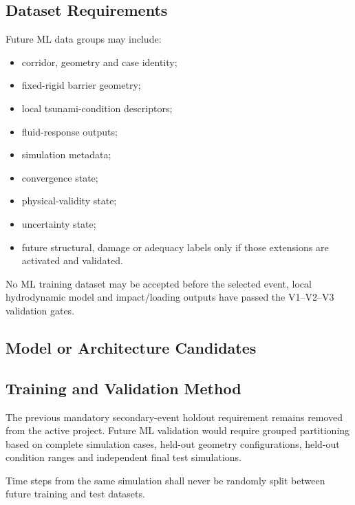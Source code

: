 
\subsection{Dataset Requirements}
\label{sec:res-ml-dat-dataset-requirements}

Future ML data groups may include:
\begin{itemize}
  \item corridor, geometry and case identity;
  \item fixed-rigid barrier geometry;
  \item local tsunami-condition descriptors;
  \item fluid-response outputs;
  \item simulation metadata;
  \item convergence state;
  \item physical-validity state;
  \item uncertainty state;
  \item future structural, damage or adequacy labels only if those
    extensions are activated and validated.
\end{itemize}

No ML training dataset may be accepted before the selected event,
local hydrodynamic model and impact/loading outputs have passed the
V1--V2--V3 validation gates.

\subsection{Model or Architecture Candidates}
\label{sec:res-ml-dat-model-architecture-candidates}


\subsection{Training and Validation Method}
\label{sec:res-ml-dat-training-validation-method}

The previous mandatory secondary-event holdout requirement remains
removed from the active project. Future ML validation would require
grouped partitioning based on complete simulation cases, held-out
geometry configurations, held-out condition ranges and independent
final test simulations.

Time steps from the same simulation shall never be randomly split between
future training and test datasets.

